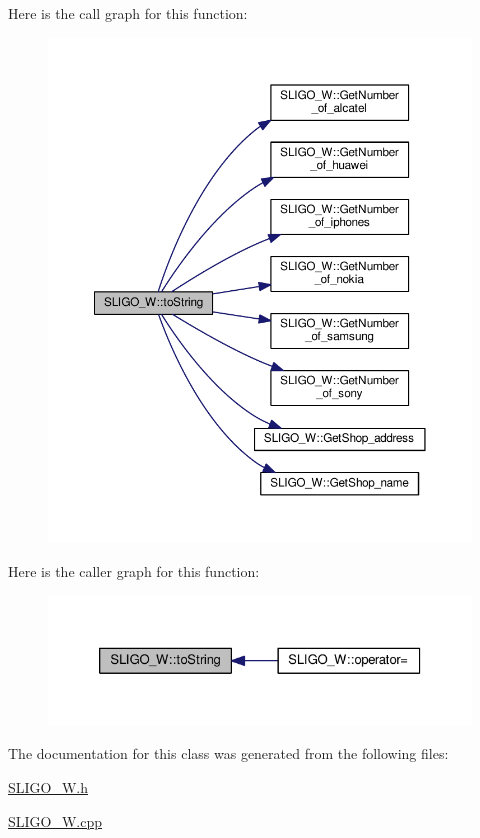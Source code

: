 Here is the call graph for this function\+:\nopagebreak
\begin{figure}[H]
\begin{center}
\leavevmode
\includegraphics[width=350pt]{class_s_l_i_g_o___w_a8f49deaa85f48ff29dd8cdeb7c9dda56_cgraph}
\end{center}
\end{figure}




Here is the caller graph for this function\+:\nopagebreak
\begin{figure}[H]
\begin{center}
\leavevmode
\includegraphics[width=326pt]{class_s_l_i_g_o___w_a8f49deaa85f48ff29dd8cdeb7c9dda56_icgraph}
\end{center}
\end{figure}




The documentation for this class was generated from the following files\+:\begin{DoxyCompactItemize}
\item 
\hyperlink{_s_l_i_g_o___w_8h}{S\+L\+I\+G\+O\+\_\+\+W.\+h}\item 
\hyperlink{_s_l_i_g_o___w_8cpp}{S\+L\+I\+G\+O\+\_\+\+W.\+cpp}\end{DoxyCompactItemize}
